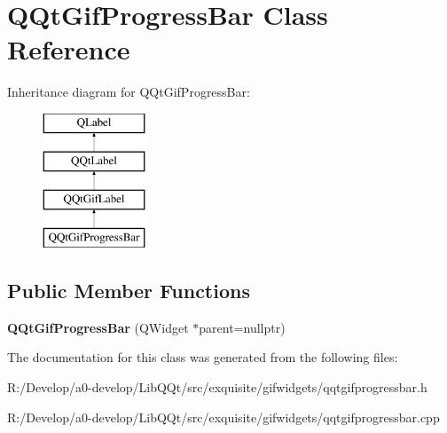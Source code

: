 \hypertarget{class_q_qt_gif_progress_bar}{}\section{Q\+Qt\+Gif\+Progress\+Bar Class Reference}
\label{class_q_qt_gif_progress_bar}
Inheritance diagram for Q\+Qt\+Gif\+Progress\+Bar\+:\begin{figure}[H]
\begin{center}
\leavevmode
\includegraphics[height=4.000000cm]{class_q_qt_gif_progress_bar}
\end{center}
\end{figure}
\subsection*{Public Member Functions}
\begin{DoxyCompactItemize}
\item 
\mbox{\label{class_q_qt_gif_progress_bar_a5d64cb5586dcac3f0d121dadc57385d2}} 
{\bfseries Q\+Qt\+Gif\+Progress\+Bar} (Q\+Widget $\ast$parent=nullptr)
\end{DoxyCompactItemize}


The documentation for this class was generated from the following files\+:\begin{DoxyCompactItemize}
\item 
R\+:/\+Develop/a0-\/develop/\+Lib\+Q\+Qt/src/exquisite/gifwidgets/qqtgifprogressbar.\+h\item 
R\+:/\+Develop/a0-\/develop/\+Lib\+Q\+Qt/src/exquisite/gifwidgets/qqtgifprogressbar.\+cpp\end{DoxyCompactItemize}
